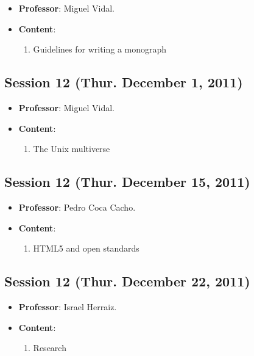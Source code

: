 \documentclass[a4paper]{article}
\begin{document}
\begin{itemize}
 \item \textbf{Professor}: Miguel Vidal.

 \item \textbf{Content}:

 \begin{enumerate}
  \item Guidelines for writing a monograph
 \end{enumerate}

\end{itemize}

\subsection{Session 12 (Thur. December 1, 2011)}

\begin{itemize}
 \item \textbf{Professor}: Miguel Vidal.

 \item \textbf{Content}:

 \begin{enumerate}
  \item The Unix multiverse
 \end{enumerate}

\end{itemize}

\subsection{Session 12 (Thur. December 15, 2011)}

\begin{itemize}
 \item \textbf{Professor}: Pedro Coca Cacho.

 \item \textbf{Content}:

 \begin{enumerate}
  \item HTML5 and open standards
 \end{enumerate}

\end{itemize}

\subsection{Session 12 (Thur. December 22, 2011)}

\begin{itemize}
 \item \textbf{Professor}: Israel Herraiz.

 \item \textbf{Content}:

 \begin{enumerate}
  \item Research
 \end{enumerate}

\end{itemize}
\end{document}
